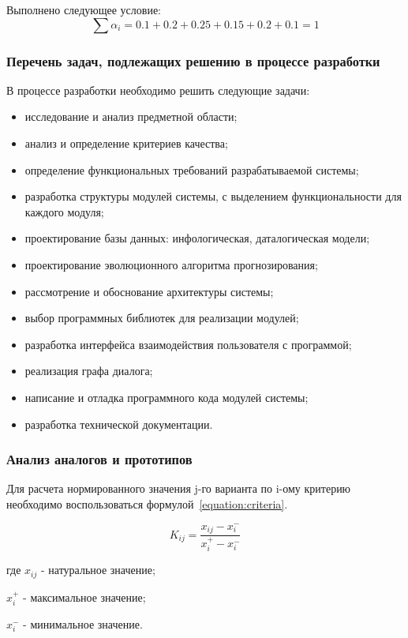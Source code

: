 Выполнено следующее условие:
\begin{equation}
\sum \alpha_i = 0.1 + 0.2 + 0.25 + 0.15 + 0.2 + 0.1 = 1
\end{equation}

\subsubsection{Перечень задач, подлежащих решению в процессе разработки}

В процессе разработки необходимо решить следующие задачи:
\begin{itemize}
\item исследование и анализ предметной области;
\item анализ и определение критериев качества;
\item определение функциональных требований разрабатываемой системы;
\item разработка структуры модулей системы, с выделением функциональности для каждого модуля;
\item проектирование базы данных: инфологическая, даталогическая модели;
\item проектирование эволюционного алгоритма прогнозирования;
\item рассмотрение и обоснование архитектуры системы;
\item выбор программных библиотек для реализации модулей;
\item разработка интерфейса взаимодействия пользователя с программой;
\item реализация графа диалога;
\item написание и отладка программного кода модулей системы;
\item разработка технической документации.
\end{itemize}

\clearpage
\subsubsection{Анализ аналогов и прототипов}

Для расчета нормированного значения j-го варианта по i-ому критерию необходимо
воспользоваться формулой~\ref{equation:criteria}.

\begin{equation}
\label{equation:criteria}
K_{ij} = \frac{x_{ij} - x_i^-}{x_i^+ - x_i^-}
\end{equation}
\begin{ESKDexplanation}
\item[где ] $x_{ij}$ - натуральное значение;
\item       $x_i^+$ - максимальное значение;
\item       $x_i^-$ - минимальное значение.
\end{ESKDexplanation}

